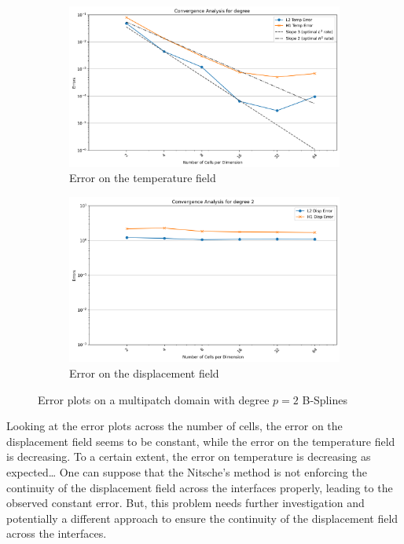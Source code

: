 \documentclass[a4paper,12pt,twoside]{report}
\begin{document}
\begin{figure}[!h]
	\centering
	\begin{subfigure}[b]{0.49\textwidth}
		\centering
		\includegraphics[width=\textwidth]{figures/figures_multipatch/Temp_multipatch.png}
		\caption{Error on the temperature field}
		\label{fig:error_temp_multipatch}
	\end{subfigure}
	\begin{subfigure}[b]{0.49\textwidth}
		\centering
		\includegraphics[width=\textwidth]{figures/figures_multipatch/Disp_multipatch.png}
		\caption{Error on the displacement field}
		\label{fig:error_disp_multipatch}
	\end{subfigure}
	\caption{Error plots on a multipatch domain with degree $p = 2$ B-Splines}
\end{figure}

Looking at the error plots across the number of cells, the error on the displacement field seems to be constant, while the error on the temperature field is decreasing. To a certain extent, the error on temperature is decreasing as expected\dots
One can suppose that the Nitsche's method is not enforcing the continuity of the displacement field across the interfaces properly, leading to the observed constant error. But, this problem needs further investigation and potentially a different approach to ensure the continuity of the displacement field across the interfaces.
\end{document}
